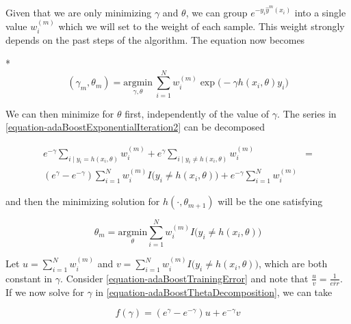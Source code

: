 Given that we are only minimizing $\gamma$ and $\theta$, we can group $e^{-y_i \hat{y}^{m}(x_i)}$ into a single value $w_i^{(m)}$ which we will set to the weight of each sample. This weight strongly depends on the past steps of the algorithm. The equation now becomes

*
\begin{equation}\label{equation-adaBoostExponentialIteration2}
(\gamma_{m}, \theta_{m}) = \underset{\gamma, \theta}{\mathrm{argmin}} \  \sum_{i=1}^{N} w_i^{(m)} \exp \big(-\gamma h(x_i,\theta)y_i \big)
\end{equation}

We can then minimize for $\theta$ first, independently of the value of $\gamma$. The series in \cref{equation-adaBoostExponentialIteration2} can be decomposed

\begin{equation}\label{equation-adaBoostThetaDecomposition}
\begin{split}
e^{-\gamma} \sum_{i \mid y_i = h(x_i,\theta)} w_i^{(m)} + e^{\gamma} \sum_{i \mid y_i \neq h(x_i,\theta)} w_i^{(m)} & = \\
( e^{\gamma} - e^{-\gamma}) \sum_{i = 1}^{N} w_i^{(m)} I \big( y_i \neq h(x_i,\theta)  \big) + e^{-\gamma} \sum_{i = 1}^{N}  w_i^{(m)} &
\end{split}
\end{equation}


and then the minimizing solution for $h(\cdot, \theta_{m+1})$ will be the one satisfying

\begin{equation}\label{equation-adaBoostThetaMinimization}
\theta_{m} = \underset{ \theta}{\mathrm{argmin}} \sum_{i=1}^{N} w_i^{(m)} I \big( y_i \neq h(x_i,\theta)  \big)
\end{equation}

Let $u = \sum_{i=1}^{N} w_i^{(m)}$ and $v = \sum_{i=1}^{N} w_i^{(m)} I \big( y_i \neq h(x_i,\theta)  \big) $, which are both constant in $\gamma$. Consider \cref{equation-adaBoostTrainingError} and note that $\frac{u}{v} = \frac{1}{\overline{err}}$. If we now solve for $\gamma$ in \cref{equation-adaBoostThetaDecomposition}, we can take

\begin{equation}\label{equation-adaBoostBetaMinimization}
f(\gamma) = ( e^{\gamma} - e^{-\gamma}) u + e^{-\gamma}v
\end{equation}

